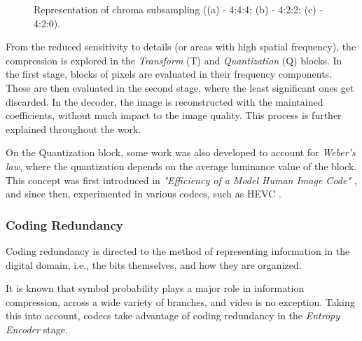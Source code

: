 \begin{figure}[h]
    \centering 
        \begin{subfigure}[c]{\textwidth}
            \centering
            
            \caption{}
            \label{subfig:444}
        \end{subfigure}
        \begin{subfigure}[c]{\textwidth}
            \centering
            
            \caption{}
            \label{subfig:422}
        \end{subfigure}
        \begin{subfigure}[c]{\textwidth}
            \centering
            
            \caption{}
            \label{subfig:420}
        \end{subfigure}
       \caption{Representation of chroma subsampling ((a) - 4:4:4; (b) - 4:2:2; (c) - 4:2:0).}
    \label{fig:subsample}
\end{figure}

From the reduced sensitivity to details (or areas with high spatial frequency), the compression is explored in the \emph{Transform} (T) and \emph{Quantization} (Q) blocks. In the first stage, blocks of pixels are evaluated in their frequency components. These are then evaluated in the second stage, where the least significant ones get discarded. In the decoder, the image is reconstructed with the maintained coefficients, without much impact to the image quality. This process is further explained throughout the work.

On the Quantization block, some work was also developed to account for \emph{Weber's law}, where the quantization depends on the average luminance value of the block. This concept was first introduced in \emph{"Efficiency of a Model Human Image Code"} \cite{watsonEfficiencyModelHuman1988}, and since then, experimented in various codecs, such as HEVC \cite{rouisPerceptualVideoContent2018}.

\subsubsection{Coding Redundancy}

Coding redundancy is directed to the method of representing information in the digital domain, i.e., the bits themselves, and how they are organized.

It is known that symbol probability plays a major role in information compression, across a wide variety of branches, and video is no exception. Taking this into account, codecs take advantage of coding redundancy in the \emph{Entropy Encoder} stage.

